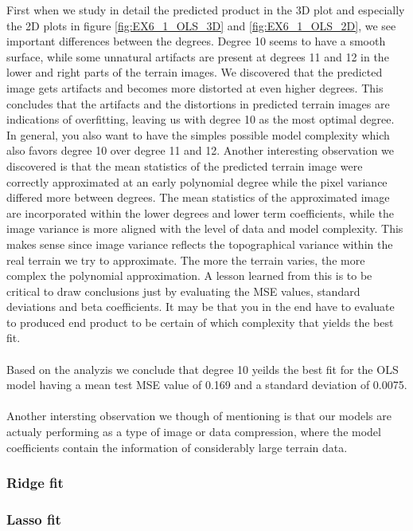 \documentclass[11pt, a4paper]{article}
\begin{document}
First when we study in detail the predicted product in the 3D plot and especially the 2D plots in figure \ref{fig:EX6_1_OLS_3D} and \ref{fig:EX6_1_OLS_2D}, we see important differences between the degrees.
Degree 10 seems to have a smooth surface, while some unnatural artifacts are present at degrees 11 and 12 in the lower and right parts of the terrain images. We discovered that the predicted image gets artifacts and becomes more distorted at even higher degrees.
This concludes that the artifacts and the distortions in predicted terrain images are indications of overfitting, leaving us with degree 10 as the most optimal degree. In general, you also want to have
the simples possible model complexity which also favors degree 10 over degree 11 and 12.
Another interesting observation we discovered is that the mean statistics of the predicted terrain image were correctly approximated at an early polynomial degree while the pixel variance differed more between degrees.
The mean statistics of the approximated image are incorporated within the lower degrees and lower term coefficients, while the image variance is more aligned with the level of data and model complexity.
This makes sense since image variance reflects the topographical variance within the real terrain we try to approximate. The more the terrain varies, the more complex the polynomial approximation.
A lesson learned from this is to be critical to draw conclusions just by evaluating the MSE values, standard deviations and beta coefficients. It may be that you in the end have to
evaluate to produced end product to be certain of which complexity that yields the best fit.
\\\\
Based on the analyzis we conclude that degree 10 yeilds the best fit for the OLS model having a mean test MSE value of 0.169 and a standard deviation of 0.0075.
\\\\
Another intersting observation we though of mentioning is that our models are actualy performing as a type of image or data compression, where the model coefficients contain the information of considerably large terrain data.

\subsubsection*{Ridge fit}
\subsubsection*{Lasso fit}
\end{document}

